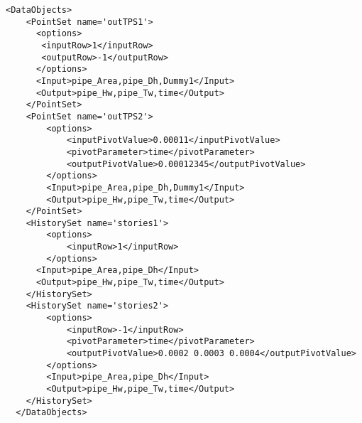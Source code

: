 \begin{lstlisting}[style=XML,morekeywords={inputTs,operator,hierarchical,name,history}]
  <DataObjects>
    <PointSet name='outTPS1'>
      <options>
       <inputRow>1</inputRow>
       <outputRow>-1</outputRow>
      </options>
      <Input>pipe_Area,pipe_Dh,Dummy1</Input>
      <Output>pipe_Hw,pipe_Tw,time</Output>
    </PointSet>
    <PointSet name='outTPS2'>
        <options>
            <inputPivotValue>0.00011</inputPivotValue>
            <pivotParameter>time</pivotParameter>
            <outputPivotValue>0.00012345</outputPivotValue>
        </options>
        <Input>pipe_Area,pipe_Dh,Dummy1</Input>
        <Output>pipe_Hw,pipe_Tw,time</Output>
    </PointSet>
    <HistorySet name='stories1'>
        <options>
            <inputRow>1</inputRow>
        </options>
      <Input>pipe_Area,pipe_Dh</Input>
      <Output>pipe_Hw,pipe_Tw,time</Output>
    </HistorySet>
    <HistorySet name='stories2'>
        <options>
            <inputRow>-1</inputRow>
            <pivotParameter>time</pivotParameter>
            <outputPivotValue>0.0002 0.0003 0.0004</outputPivotValue>
        </options>
        <Input>pipe_Area,pipe_Dh</Input>
        <Output>pipe_Hw,pipe_Tw,time</Output>
    </HistorySet>
  </DataObjects>
\end{lstlisting}

